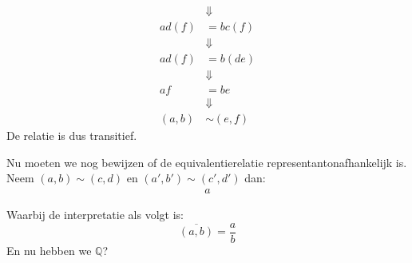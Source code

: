 \documentclass{article}
\newcommand{\ol}[1]{\overline{#1}}
\begin{document}
\begin{enumerate}[label=\arabic*]
\begin{align*}
		                         & \Downarrow       \\
		      ad(f)              & = bc(f)          \\
		                         & \Downarrow       \\
		      ad(f)              & = b(de)          \\
		                         & \Downarrow       \\
		      af                 & = be             \\
		                         & \Downarrow       \\
		      (a,b)              & \sim (e,f)
	      \end{align*}
	      De relatie is dus transitief.
\end{enumerate}
Nu moeten we nog bewijzen of de equivalentierelatie representantonafhankelijk is. Neem $(a,b) \sim (c,d)$ en $(a',b') \sim (c',d')$ dan:
\begin{align*}
	a
\end{align*}

Waarbij de interpretatie als volgt is:
\[\ol{(a, b)} = \frac{a}{b}\]
En nu hebben we $\mathbb{Q}$?
\end{document}
